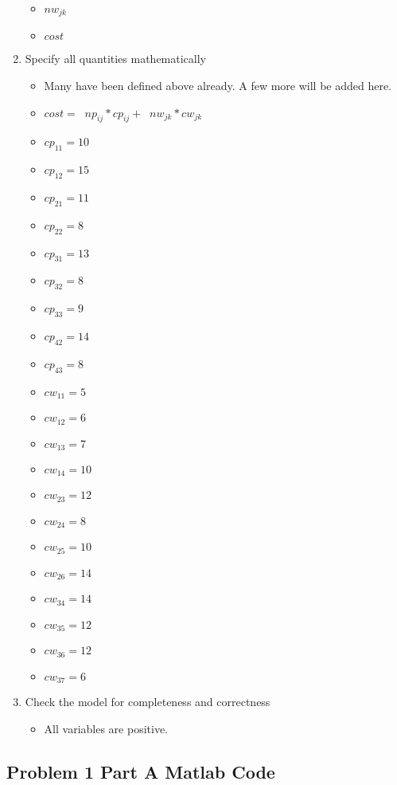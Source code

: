 \documentclass[../report/main.tex]{subfiles}
\begin{document}
\begin{enumerate}[1.]
\begin{itemize}
		\item $nw_{jk}$
		\item $cost$
	\end{itemize}
	\item Specify all quantities mathematically
	\begin{itemize}
		\item Many have been defined above already.  A few more will be added here.
		\item $cost = \mathop{\sum_{i=1}^{n}\sum_{j=1}^{q}}np_{ij}*cp_{ij} +  \mathop{\sum_{j=1}^{q}\sum_{k=1}^{m}}nw_{jk}*cw_{jk}$
		\item $cp_{11} = 10$
		\item $cp_{12} = 15$
		\item $cp_{21} = 11$
		\item $cp_{22} = 8$
		\item $cp_{31} = 13$
		\item $cp_{32} = 8$
		\item $cp_{33} = 9$
		\item $cp_{42} = 14$
		\item $cp_{43} = 8$
		\item $cw_{11} = 5$
		\item $cw_{12} = 6$
		\item $cw_{13} = 7$
		\item $cw_{14} = 10$
		\item $cw_{23} = 12$
		\item $cw_{24} = 8$
		\item $cw_{25} = 10$
		\item $cw_{26} = 14$
		\item $cw_{34} = 14$
		\item $cw_{35} = 12$
		\item $cw_{36} = 12$
		\item $cw_{37} = 6$
	\end{itemize}
	\item Check the model for completeness and correctness
	\begin{itemize}
	\item All variables are positive.
	\end{itemize}
\end{enumerate}
\subsection*{Problem 1 Part A Matlab Code}

\end{document}
